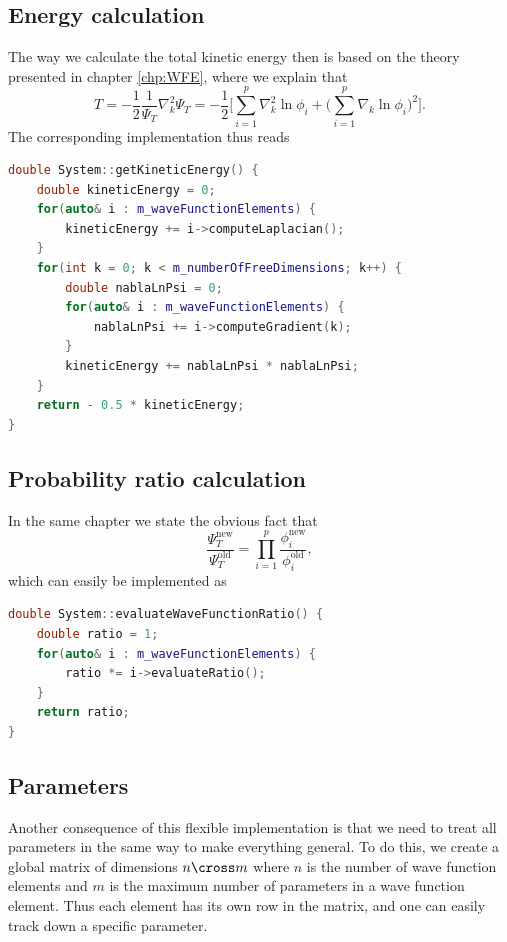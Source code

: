 \subsection{Energy calculation}
The way we calculate the total kinetic energy then is based on the theory presented in chapter \ref{chp:WFE}, where we explain that
\begin{equation}
T=-\frac{1}{2}\frac{1}{\Psi_T}\nabla_k^2\Psi_T=-\frac{1}{2}\bigg[\sum_{i=1}^p\nabla_k^2\ln\phi_i + \Big(\sum_{i=1}^p\nabla_k\ln\phi_i\Big)^2\bigg].
\end{equation}
The corresponding implementation thus reads
\lstset{basicstyle=\scriptsize}
\begin{lstlisting}[language=c++,caption={from \lstinline{system.cpp}}]
double System::getKineticEnergy() {
    double kineticEnergy = 0;
    for(auto& i : m_waveFunctionElements) {
        kineticEnergy += i->computeLaplacian();
    }
    for(int k = 0; k < m_numberOfFreeDimensions; k++) {
        double nablaLnPsi = 0;
        for(auto& i : m_waveFunctionElements) {
            nablaLnPsi += i->computeGradient(k);
        }
        kineticEnergy += nablaLnPsi * nablaLnPsi;
    }
    return - 0.5 * kineticEnergy;
}
\end{lstlisting}

\subsection{Probability ratio calculation}
In the same chapter we state the obvious fact that 
\begin{equation*}
	\frac{\Psi_T^{\text{new}}}{\Psi_T^{\text{old}}}=\prod_{i=1}^p\frac{\phi_i^{\text{new}}}{\phi_i^{\text{old}}},
\end{equation*}
which can easily be implemented as
\lstset{basicstyle=\scriptsize}
\begin{lstlisting}[language=c++,caption={from \lstinline{system.cpp}}]
double System::evaluateWaveFunctionRatio() {
    double ratio = 1;
    for(auto& i : m_waveFunctionElements) {
        ratio *= i->evaluateRatio();
    }
    return ratio;
}
\end{lstlisting}

\subsection{Parameters}
Another consequence of this flexible implementation is that we need to treat all parameters in the same way to make everything general. To do this, we create a global matrix of dimensions $n \cross m$ where $n$ is the number of wave function elements and $m$ is the maximum number of parameters in a wave function element. Thus each element has its own row in the matrix, and one can easily track down a specific parameter. 

